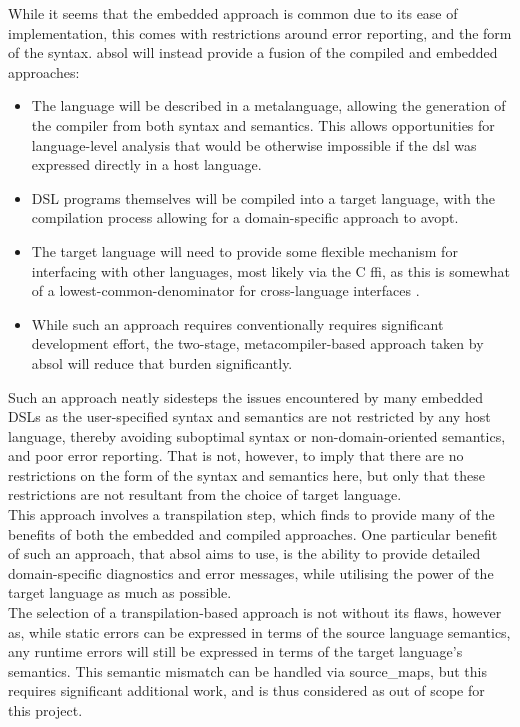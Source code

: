 While it seems that the embedded approach is common due to its ease of implementation, this comes with restrictions around error reporting, and the form of the syntax. 
\gls{absol} will instead provide a fusion of the compiled and embedded approaches:
\begin{itemize}
    \item The language will be described in a metalanguage, allowing the generation of the compiler from both syntax and semantics.
    This allows opportunities for language-level analysis that would be otherwise impossible if the \gls{dsl} was expressed directly in a host language.
    \item DSL programs themselves will be compiled into a target language, with the compilation process allowing for a domain-specific approach to \gls{avopt}.
    \item The target language will need to provide some flexible mechanism for interfacing with other languages, most likely via the C \gls{ffi}, as this is somewhat of a lowest-common-denominator for cross-language interfaces \citep{van2001asf+}.
    \item While such an approach requires conventionally requires significant development effort, the two-stage, metacompiler-based approach taken by \gls{absol} will reduce that burden significantly.
\end{itemize}

Such an approach neatly sidesteps the issues encountered by many embedded DSLs as the user-specified syntax and semantics are not restricted by any host language, thereby avoiding suboptimal syntax or non-domain-oriented semantics, and poor error reporting.
That is not, however, to imply that there are no restrictions on the form of the syntax and semantics here, but only that these restrictions are not resultant from the choice of target language. \\

This approach involves a \gls{transpilation} step, which \citet{kulkarnitranspiler} finds to provide many of the benefits of both the embedded and compiled approaches. 
One particular benefit of such an approach, that \gls{absol} aims to use, is the ability to provide detailed domain-specific diagnostics and error messages, while utilising the power of the target language as much as possible.\\

The selection of a transpilation-based approach is not without its flaws, however as, while static errors can be expressed in terms of the source language semantics, any runtime errors will still be expressed in terms of the target language's semantics. 
This semantic mismatch can be handled via \glspl{source_map}, but this requires significant additional work, and is thus considered as out of scope for this project. 

